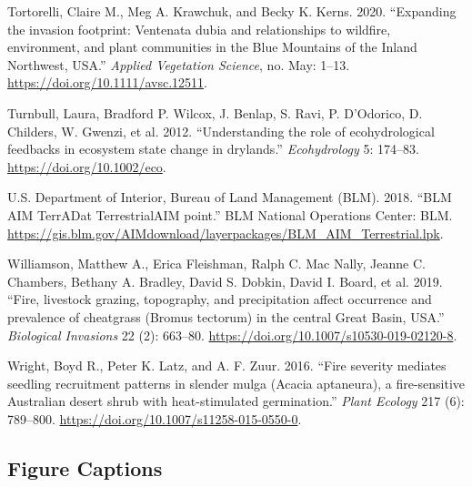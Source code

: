 \documentclass[
  12pt,
]{article}
\newlength{\cslhangindent}
\newlength{\cslentryspacingunit} %
\newenvironment{CSLReferences}[2] %
 {%
  \setlength{\parindent}{0pt}
  \ifodd #1
  \let\oldpar\par
  \def\par{\hangindent=\cslhangindent\oldpar}
  \fi
  \setlength{\parskip}{#2\cslentryspacingunit}
 }%
 {}
\begin{document}
\begin{CSLReferences}{1}{0}
\leavevmode{}%
Tortorelli, Claire M., Meg A. Krawchuk, and Becky K. Kerns. 2020.
{``{Expanding the invasion footprint: Ventenata dubia and relationships
to wildfire, environment, and plant communities in the Blue Mountains of
the Inland Northwest, USA}.''} \emph{Applied Vegetation Science}, no.
May: 1--13. \url{https://doi.org/10.1111/avsc.12511}.

\leavevmode{}%
Turnbull, Laura, Bradford P. Wilcox, J. Benlap, S. Ravi, P. D'Odorico,
D. Childers, W. Gwenzi, et al. 2012. {``{Understanding the role of
ecohydrological feedbacks in ecosystem state change in drylands}.''}
\emph{Ecohydrology} 5: 174--83. \url{https://doi.org/10.1002/eco}.

\leavevmode{}%
U.S. Department of Interior, Bureau of Land Management (BLM). 2018.
{``{BLM AIM TerrADat TerrestrialAIM point}.''} BLM National Operations
Center: BLM.
\url{https://gis.blm.gov/AIMdownload/layerpackages/BLM_AIM_Terrestrial.lpk}.

\leavevmode{}%
Williamson, Matthew A., Erica Fleishman, Ralph C. Mac Nally, Jeanne C.
Chambers, Bethany A. Bradley, David S. Dobkin, David I. Board, et al.
2019. {``{Fire, livestock grazing, topography, and precipitation affect
occurrence and prevalence of cheatgrass (Bromus tectorum) in the central
Great Basin, USA}.''} \emph{Biological Invasions} 22 (2): 663--80.
\url{https://doi.org/10.1007/s10530-019-02120-8}.

\leavevmode{}%
Wright, Boyd R., Peter K. Latz, and A. F. Zuur. 2016. {``{Fire severity
mediates seedling recruitment patterns in slender mulga (Acacia
aptaneura), a fire-sensitive Australian desert shrub with
heat-stimulated germination}.''} \emph{Plant Ecology} 217 (6): 789--800.
\url{https://doi.org/10.1007/s11258-015-0550-0}.

\end{CSLReferences}

\newpage

\hypertarget{figure-captions}{%
\subsection{Figure Captions}\label{figure-captions}}
\end{document}
